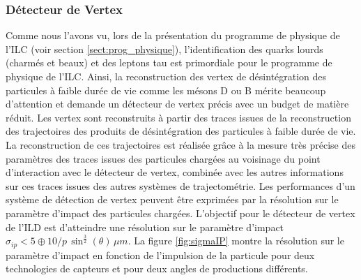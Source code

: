   \subsubsection{Détecteur de Vertex}
  \label{sect:paramVTX}
  
  Comme nous l'avons vu, lors de la pr\'esentation du programme de physique de l'ILC (voir section \ref{sect:prog_physique}), l'identification des quarks lourds (charm\'es et beaux) et des leptons tau est primordiale pour le programme de physique de l'ILC. Ainsi, la reconstruction des vertex de d\'esint\'egration des particules \`a faible dur\'ee de vie comme les m\'esons D ou B m\'erite beaucoup d'attention et demande un détecteur de vertex pr\'ecis avec un budget de mati\`ere r\'eduit. Les vertex sont reconstruits \`a partir des traces issues de la reconstruction des trajectoires des produits de d\'esint\'egration des particules \`a faible dur\'ee de vie. La reconstruction de ces trajectoires est r\'ealis\'ee gr\^ace \`a la mesure tr\`es pr\'ecise des param\`etres des traces issues des particules charg\'ees au voisinage du point d'interaction avec le d\'etecteur de vertex, combin\'ee avec les autres informations sur ces traces issues des autres syst\`emes de trajectom\'etrie. Les performances d'un syst\`eme de d\'etection de vertex peuvent \^etre exprim\'ees par la r\'esolution sur le param\`etre d'impact des particules charg\'ees. L'objectif pour le d\'etecteur de vertex de l'ILD est d'atteindre une r\'esolution sur le param\`etre d'impact $\sigma_{ip} < 5 \oplus 10/p \, \sin^{\frac{3}{2}}(\theta) \, \mu m$. La figure \ref{fig:sigmaIP} montre la résolution sur le param\`etre d'impact en fonction de l'impulsion de la particule pour deux technologies de capteurs et pour deux angles de productions diff\'erents.
  
